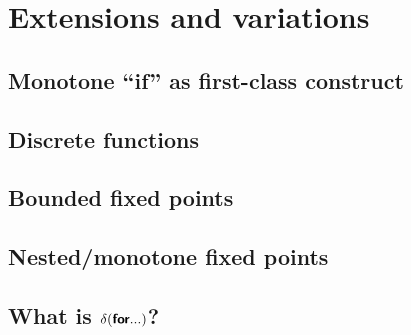 \chapter{Extensions and variations}

\section{Monotone ``if'' as first-class construct}

\section{Discrete functions}
\label{section-discrete-functions}


\section{Bounded fixed points}
\label{section-bounded-fixed-points}


\section{Nested/monotone fixed points}
\label{section-nested-fixed-points}


\section{What is \texorpdfstring{\boldmath$\delta(\textsf{\bfseries for} ...)$}{\textdelta(for ...)}?}

